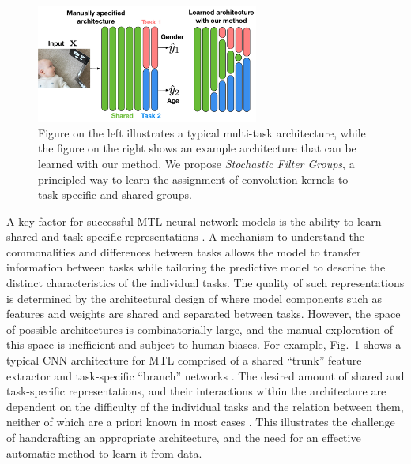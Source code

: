 \begin{figure}[t]
\centering 
\includegraphics[width=0.65\textwidth]{chapter_6/figures/intro_2.pdf}
\caption{\footnotesize Figure on the left illustrates a typical multi-task architecture, while the figure on the right shows an example architecture that can be learned with our method. We propose \emph{Stochastic Filter Groups}, a principled way to learn the assignment of convolution kernels to task-specific and shared groups. }
\label{fig:intro}
\vspace{-4mm}
\end{figure}

A key factor for successful MTL neural network models is the ability to learn shared and task-specific representations \cite{MisraCrossMTL16}. A mechanism to understand the commonalities and differences between tasks allows the model to transfer information between tasks while tailoring the predictive model to describe the distinct characteristics of the individual tasks. The quality of such representations is determined by the architectural design of where model components such as features \cite{Ruder2019SluiceNL} and weights \cite{meyerson2018beyond} are shared and separated between tasks. However, the space of possible architectures is combinatorially large, and the manual exploration of this space is inefficient and subject to human biases. For example, Fig.~\ref{fig:intro} shows a typical CNN architecture for MTL comprised of a shared ``trunk'' feature extractor and task-specific ``branch'' networks \cite{tanno2018autodvt,huang2015cross,jou2016deep,kendall2017multi,ranjan2019hyperface, bragman2018multi}. The desired amount of shared and task-specific representations, and their interactions within the architecture are dependent on the difficulty of the individual tasks and the relation between them, neither of which are a priori known in most cases \cite{taskonomy2018}. This illustrates the challenge of handcrafting an appropriate architecture, and the need for an effective automatic method to learn it from data. 


